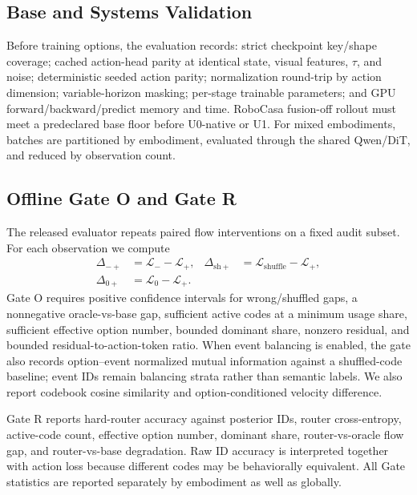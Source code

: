 \subsection{Base and Systems Validation}

Before training options, the evaluation records: strict checkpoint key/shape
coverage; cached action-head parity at identical state, visual features,
\(\tau\), and noise; deterministic seeded action parity; normalization
round-trip by action dimension; variable-horizon masking; per-stage trainable
parameters; and GPU forward/backward/predict memory and time.  RoboCasa
fusion-off rollout must meet a predeclared base floor before U0-native or U1.
For mixed embodiments, batches are partitioned by embodiment, evaluated through
the shared Qwen/DiT, and reduced by observation count.

\subsection{Offline Gate O and Gate R}

The released evaluator repeats paired flow interventions on a fixed audit
subset.  For each observation we compute
\[
\begin{aligned}
\Delta_{-\!+}&=\mathcal{L}_{-}-\mathcal{L}_{+},&
\Delta_{\mathrm{sh}\!+}&=\mathcal{L}_{\mathrm{shuffle}}-\mathcal{L}_{+},\\
\Delta_{0+}&=\mathcal{L}_{0}-\mathcal{L}_{+}.&&
\end{aligned}
\]
Gate O requires positive confidence intervals for wrong/shuffled gaps, a
nonnegative oracle-vs-base gap, sufficient active codes at a minimum usage
share, sufficient effective option number, bounded dominant share, nonzero
residual, and bounded residual-to-action-token ratio.  When event balancing is
enabled, the gate also records option--event normalized mutual information
against a shuffled-code baseline; event IDs remain balancing strata rather than
semantic labels.  We also report codebook cosine similarity and
option-conditioned velocity difference.

Gate R reports hard-router accuracy against posterior IDs, router cross-entropy,
active-code count, effective option number, dominant share, router-vs-oracle
flow gap, and router-vs-base degradation.  Raw ID accuracy is interpreted
together with action loss because different codes may be behaviorally
equivalent.  All Gate statistics are reported separately by embodiment as well
as globally.



